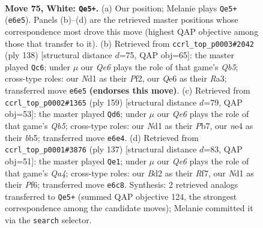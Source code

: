 \documentclass[11pt]{article}
\begin{document}
\clearpage

\begin{figure}[p]\centering
\begin{subfigure}{0.46\textwidth}\centering
\resizebox{\linewidth}{!}{%
\newchessgame
\chessboard[
  setfen={r7/q3b1k1/4Q3/P1p2p2/3pnPp1/8/1R1BP3/3NK3 w - - 10 75},
  showmover=false,
  pgfstyle=straightmove, color=movearrow, markmove={e6-e5}
]}
\caption{}
\end{subfigure}\hfill
\begin{subfigure}{0.46\textwidth}\centering
\resizebox{\linewidth}{!}{%
\newchessgame
\chessboard[
  setfen={4qr1k/8/1p1p3P/bQnPpBp1/4P1N1/R7/5PK1/8 w - - 7 70},
  showmover=false,
  pgfstyle=straightmove, color=movearrow, markmove={b5-c6}
]}
\caption{}
\end{subfigure}
\\[4pt]
\begin{subfigure}{0.46\textwidth}\centering
\resizebox{\linewidth}{!}{%
\newchessgame
\chessboard[
  setfen={8/1p3pk1/6p1/1B1Pp3/Pq1bP3/3Q2P1/5PK1/8 b - - 60 80},
  showmover=false,
  pgfstyle=straightmove, color=movearrow, markmove={b4-d6}
]}
\caption{}
\end{subfigure}\hfill
\begin{subfigure}{0.46\textwidth}\centering
\resizebox{\linewidth}{!}{%
\newchessgame
\chessboard[
  setfen={8/p4rk1/P3ppb1/qP2p3/B1R1P3/3Q4/5PK1/8 b - - 22 69},
  showmover=false,
  pgfstyle=straightmove, color=movearrow, markmove={a5-e1}
]}
\caption{}
\end{subfigure}
\caption{\textbf{Move 75, White: \texttt{Qe5+}.} (a) Our position; Melanie plays \texttt{Qe5+} (\texttt{e6e5}). Panels (b)--(d) are the retrieved master positions whose correspondence most drove this move (highest QAP objective among those that transfer to it). (b) Retrieved from \texttt{ccrl\_top\_p0003\#2042} (ply 138) [structural distance $d$=75, QAP obj=65]: the master played \texttt{Qc6}; under $\mu$ our \emph{Qe6} plays the role of that game's \emph{Qb5}; cross-type roles: our \emph{N}d1 as their \emph{P}f2, our \emph{Q}e6 as their \emph{R}a3; transferred move \texttt{e6e5} \textbf{(endorses this move)}. (c) Retrieved from \texttt{ccrl\_top\_p0002\#1365} (ply 159) [structural distance $d$=79, QAP obj=53]: the master played \texttt{Qd6}; under $\mu$ our \emph{Qe6} plays the role of that game's \emph{Qb5}; cross-type roles: our \emph{N}d1 as their \emph{P}b7, our \emph{n}e4 as their \emph{b}b5; transferred move \texttt{e6e4}. (d) Retrieved from \texttt{ccrl\_top\_p0001\#3876} (ply 137) [structural distance $d$=83, QAP obj=51]: the master played \texttt{Qe1}; under $\mu$ our \emph{Qe6} plays the role of that game's \emph{Qa4}; cross-type roles: our \emph{B}d2 as their \emph{R}f7, our \emph{N}d1 as their \emph{P}f6; transferred move \texttt{e6c8}. Synthesis: 2 retrieved analogs transferred to \texttt{Qe5+} (summed QAP objective 124, the strongest correspondence among the candidate moves); Melanie committed it via the \texttt{search} selector.}
\label{fig:thought-m148}
\end{figure}
\end{document}
